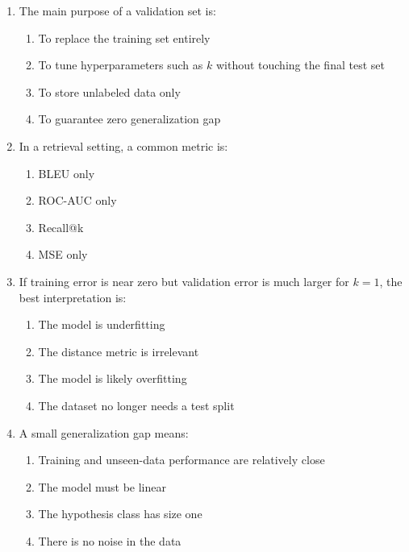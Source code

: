 \begin{enumerate}[label=\textbf{MCQ \arabic*.}]
  \item The main purpose of a validation set is:
  \begin{enumerate}[label=(\Alph*)]
    \item To replace the training set entirely
    \item To tune hyperparameters such as $k$ without touching the final test set
    \item To store unlabeled data only
    \item To guarantee zero generalization gap
  \end{enumerate}

  \item In a retrieval setting, a common metric is:
  \begin{enumerate}[label=(\Alph*)]
    \item BLEU only
    \item ROC-AUC only
    \item Recall@k
    \item MSE only
  \end{enumerate}

  \item If training error is near zero but validation error is much larger for $k=1$, the best interpretation is:
  \begin{enumerate}[label=(\Alph*)]
    \item The model is underfitting
    \item The distance metric is irrelevant
    \item The model is likely overfitting
    \item The dataset no longer needs a test split
  \end{enumerate}

  \item A small generalization gap means:
  \begin{enumerate}[label=(\Alph*)]
    \item Training and unseen-data performance are relatively close
    \item The model must be linear
    \item The hypothesis class has size one
    \item There is no noise in the data
  \end{enumerate}
\end{enumerate}


